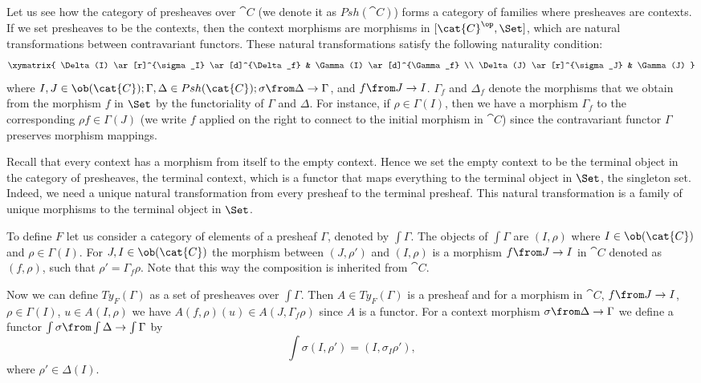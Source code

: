 Let us see how the category of presheaves over $\cat{C}$ (we denote it as
$Psh(\cat{C})$) forms a category of families where presheaves are contexts.  If
we set presheaves to be the contexts, then the context morphisms are morphisms
in $[\cat{C}^\op, \Set]$, which are natural transformations between contravariant
functors. These natural transformations satisfy the following naturality
condition:
\[
  \xymatrix{
    \Delta(I) \ar[r]^{\sigma_I} \ar[d]^{\Delta_f} & \Gamma(I) \ar[d]^{\Gamma_f} \\
    \Delta(J) \ar[r]^{\sigma_J} & \Gamma(J)
  }
\]
where $I, J \in \ob(\cat{C}); \Gamma, \Delta \in Psh(\cat{C}); \sigma
\from \Delta \to \Gamma$, and $f \from J \to I$. $\Gamma_f$ and $\Delta_f$
denote the morphisms that we obtain from the morphism $f$ in $\Set$ by the
functoriality of $\Gamma$ and $\Delta$. For instance, if $\rho \in \Gamma(I)$,
then we have a morphism $\Gamma_f$ to the corresponding $\rho f \in \Gamma(J)$
(we write $f$ applied on the right to connect to the initial morphism in
$\cat{C}$) since the contravariant functor $\Gamma$ preserves morphism
mappings.

Recall that every context has a morphism from itself to the empty context.
Hence we set the empty context to be the terminal object in the category of
presheaves, the terminal context, which is a functor that maps everything to
the terminal object in $\Set$, the singleton set. Indeed, we need a unique
natural transformation from every presheaf to the terminal presheaf. This
natural transformation is a family of unique morphisms to the terminal object
in $\Set$.

To define $F$ let us consider a category of elements of a presheaf $\Gamma$,
denoted by $\int\Gamma$. The objects of $\int \Gamma$ are $(I, \rho)$ where
$I \in \ob(\cat{C})$ and $\rho \in \Gamma(I)$. For $J, I \in \ob(\cat{C})$ the
morphism between $(J, \rho')$ and $(I, \rho)$ is a morphism $f \from J \to I$
in $\cat{C}$ denoted as $(f, \rho)$, such that $\rho' = \Gamma_f \rho$. Note
that this way the composition is inherited from $\cat{C}$.

Now we can define $Ty_F(\Gamma)$ as a set of presheaves over $\int \Gamma$.
Then $A \in Ty_F(\Gamma)$ is a presheaf and for a morphism in $\cat{C}$, $f
\from J \to I$, $\rho \in \Gamma(I)$, $u \in A(I, \rho)$ we have $A(f, \rho)(u)
\in A(J, \Gamma_f \rho)$ since $A$ is a functor. For a context morphism $\sigma
\from \Delta \to \Gamma$ we define a functor $\int \sigma \from \int \Delta \to
\int \Gamma$ by
\[
 \int \sigma (I, \rho') = (I, \sigma_I \rho'),
\]
where $\rho' \in \Delta(I)$.

